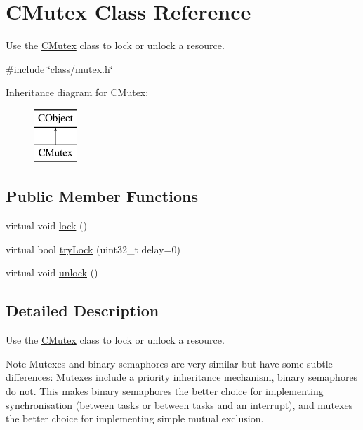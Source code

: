 \hypertarget{class_c_mutex}{\section{C\-Mutex Class Reference}
\label{class_c_mutex}
}


Use the \hyperlink{class_c_mutex}{C\-Mutex} class to lock or unlock a resource.  




{\ttfamily \#include \char`\"{}class/mutex.\-h\char`\"{}}

Inheritance diagram for C\-Mutex\-:\begin{figure}[H]
\begin{center}
\leavevmode
\includegraphics[height=2.000000cm]{class_c_mutex}
\end{center}
\end{figure}
\subsection*{Public Member Functions}
\begin{DoxyCompactItemize}
\item 
virtual void \hyperlink{class_c_mutex_a820d77775dfd7d5dddfdac6bbf89b67a}{lock} ()
\item 
virtual bool \hyperlink{class_c_mutex_adb89cb4258a492458db9fb614c1681a9}{try\-Lock} (uint32\-\_\-t delay=0)
\item 
virtual void \hyperlink{class_c_mutex_aee0e6661ae4b790104a9a4205910d53d}{unlock} ()
\end{DoxyCompactItemize}


\subsection{Detailed Description}
Use the \hyperlink{class_c_mutex}{C\-Mutex} class to lock or unlock a resource. 

\begin{DoxyNote}{Note}
Mutexes and binary semaphores are very similar but have some subtle differences\-: Mutexes include a priority inheritance mechanism, binary semaphores do not. This makes binary semaphores the better choice for implementing synchronisation (between tasks or between tasks and an interrupt), and mutexes the better choice for implementing simple mutual exclusion. 
\end{DoxyNote}


